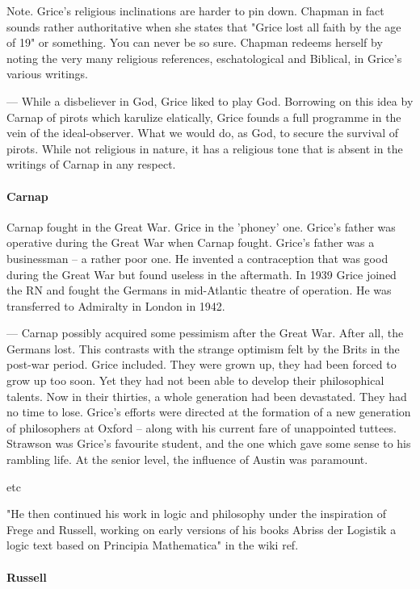\documentclass[10pt,titlepage]{book}
\begin{document}
Note. Grice's religious inclinations are harder to pin down. Chapman in  
fact sounds rather authoritative when she states that "Grice lost all faith by 
 the age of 19" or something. You can never be so sure. Chapman redeems 
herself  by noting the very many religious references, eschatological and 
Biblical, in  Grice's various writings.
 
--- While a disbeliever in God, Grice liked to play God. Borrowing on  
this idea by Carnap of pirots which karulize elatically, Grice founds a full  
programme in the vein of the ideal-observer. What we would do, as God, to 
secure  the survival of pirots. While not religious in nature, it has a 
religious tone  that is absent in the writings of Carnap in any respect.
 
\paragraph{Carnap}

Carnap fought in the Great War. Grice in the 'phoney' one. Grice's father  
was operative during the Great War when Carnap fought. Grice's father was a  
businessman -- a rather poor one. He invented a contraception that was good 
 during the Great War but found useless in the aftermath. In 1939 Grice 
joined  the RN and fought the Germans in mid-Atlantic theatre of operation. He 
was  transferred to Admiralty in London in 1942. 
 
--- Carnap possibly acquired some pessimism after the Great War. After all, 
 the Germans lost. This contrasts with the strange optimism felt by the  
Brits in the post-war period. Grice included. They were grown up, they had 
been  forced to grow up too soon. Yet they had not been able to develop their  
philosophical talents. Now in their thirties, a whole generation had been  
devastated. They had no time to lose. Grice's efforts were directed at the  
formation of a new generation of philosophers at Oxford -- along with his  
current fare of unappointed tuttees. Strawson was Grice's favourite student, 
and  the one which gave some sense to his rambling life. At the senior level, 
the  influence of Austin was paramount.
 
etc

"He then continued his work in logic and philosophy under  the inspiration 
of Frege and Russell, working on early versions of his books  Abriss der 
Logistik a logic text based on Principia Mathematica" in  the wiki ref.
 

\paragraph{Russell}
 
\end{document}
